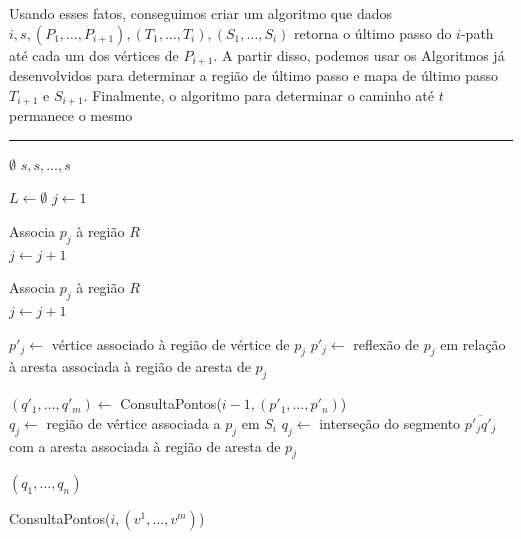 \documentclass[11pt]{article}
\newcounter{algorithm}
\newcommand{\alglabel}[1]{%
	\refstepcounter{algorithm}%
	\label{#1}%
}
\begin{document}
Usando esses fatos, conseguimos criar um algoritmo que dados \(i, s, (P_1, \dots, P_{i + 1}), (T_1, \dots, T_i), (S_1, \dots, S_i)\) retorna o último passo do \(i\)-path até cada um dos vértices de \(P_{i + 1}\). A partir disso, podemos usar os Algoritmos já desenvolvidos para determinar a região de último passo e mapa de último passo \(T_{i + 1}\) e \(S_{i + 1}\). Finalmente, o algoritmo para determinar o caminho até \(t\) permanece o mesmo

\begin{algorithm}[!ht]
\alglabel{alg:locate-points-4}
\caption{Consulta Polígono}
\vspace{0.3em}
\hrule
\vspace{0.3em}

 {

	 {
		\Return {} \(\emptyset\)
	}  {
		\Return {} \({s, s, \dots, s}\) 
	}

	\(L \leftarrow \emptyset\)
	\(j \leftarrow 1\) 

	 {

		 {
			 {
				 {
					Associa \(p_j\) à região \(R\) \\
					\(j \leftarrow j + 1\)
				}
			}
		}

		 {
			 {
				 {
					Associa \(p_j\) à região \(R\) \\
					\(j \leftarrow j + 1\)
				}
			}
		}
	}

	 {
		 {
			\(p'_j \leftarrow\) vértice associado à região de vértice de \(p_j\)
		}  {
			\(p'_j \leftarrow\) reflexão de \(p_j\) em relação à aresta associada à região de aresta de \(p_j\)
		} 
	}

	\((q'_1, \dots, q'_m) \leftarrow\) ConsultaPontos(\(i - 1, (p'_1, \dots, p'_n)\)) \\

	 {
		 {
			\(q_j \leftarrow\) região de vértice associada a \(p_j\) em \(S_i\)
		}  {
			\(q_j \leftarrow\) interseção do segmento \(\overline{p'_j q'_j}\) com a aresta associada à região de aresta de \(p_j\)
		} 
	}

	\Return {} \((q_1, \dots, q_n)\)
}

 {
	\Return {} ConsultaPontos(\(i, (v^1, \dots, v^m)\)) 
}

\end{algorithm}
\end{document}
